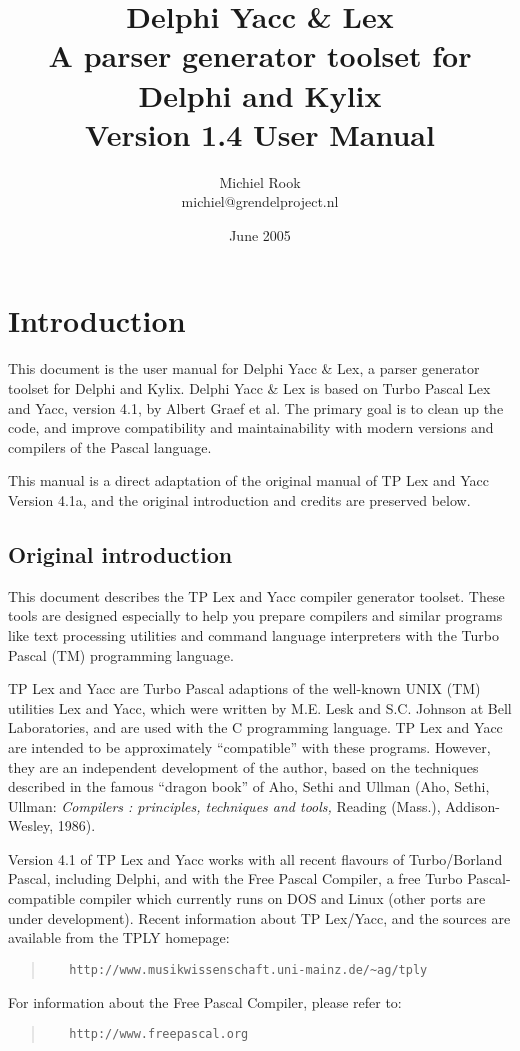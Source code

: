 \documentclass{article}
\title{Delphi Yacc \& Lex\\A parser generator toolset for Delphi and Kylix\\
       Version 1.4 User Manual}
\author{Michiel Rook\\michiel@grendelproject.nl}
\date{June 2005}
\begin{document}
\maketitle

\thispagestyle{empty}
\newpage

\pagestyle{plain}
\tableofcontents

\newpage

\section{Introduction}

This document is the user manual for Delphi Yacc \& Lex, a parser
generator toolset for Delphi and Kylix. Delphi Yacc \& Lex is based on 
Turbo Pascal Lex and Yacc, version 4.1, by Albert Graef et al. 
The primary goal is to clean up the code, and improve compatibility and 
maintainability with modern versions and compilers of the Pascal language.

This manual is a direct adaptation of the original manual of
TP Lex and Yacc Version 4.1a, and the original introduction and credits
are preserved below.

\subsection{Original introduction}

This document describes the TP Lex and Yacc compiler generator toolset.
These tools are designed especially to help you prepare compilers and
similar programs like text processing utilities and command language
interpreters with the Turbo Pascal (TM) programming language.

TP Lex and Yacc are Turbo Pascal adaptions of the well-known UNIX (TM)
utilities Lex and Yacc, which were written by M.E. Lesk and S.C. Johnson
at Bell Laboratories, and are used with the C programming language. TP Lex
and Yacc are intended to be approximately ``compatible'' with these programs.
However, they are an independent development of the author, based on the
techniques described in the famous ``dragon book'' of Aho, Sethi and Ullman
(Aho, Sethi, Ullman: {\em Compilers : principles, techniques and tools,\/}
Reading (Mass.), Addison-Wesley, 1986).

Version 4.1 of TP Lex and Yacc works with all recent flavours of Turbo/Borland
Pascal, including Delphi, and with the Free Pascal Compiler, a free Turbo
Pascal-compatible compiler which currently runs on DOS and Linux (other ports
are under development). Recent information about TP Lex/Yacc, and the sources
are available from the TPLY homepage:
\begin{quote}\begin{verbatim}
   http://www.musikwissenschaft.uni-mainz.de/~ag/tply
\end{verbatim}\end{quote}
For information about the Free Pascal Compiler, please refer to:
\begin{quote}\begin{verbatim}
   http://www.freepascal.org
\end{verbatim}\end{quote}
\end{document}
